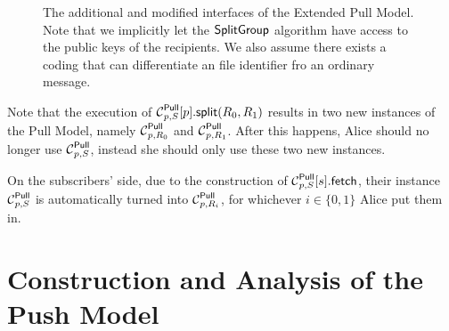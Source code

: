 \begin{figure}
  \caption{%
    The additional and modified interfaces of the Extended Pull Model.
    Note that we implicitly let the \(\SplitGroup\) algorithm have access to 
    the public keys of the recipients.
    We also assume there exists a coding that can differentiate an file 
    identifier fro an ordinary message.
  }\label{ExtPullFunctions}
\end{figure}

Note that the execution of \(\psplit[p, S]{p}[R_0, R_1]\) results in two new 
instances of the Pull Model, namely \(\Pull[p, R_0]\) and \(\Pull[p, R_1]\).
After this happens, Alice should no longer use \(\Pull[p, S]\), instead she 
should only use these two new instances.

On the subscribers' side, due to the construction of \(\pget[p, S]{s}\), their 
instance \(\Pull[p, S]\) is automatically turned into \(\Pull[p, R_i]\), for 
whichever \(i\in \{0, 1\}\) Alice put them in.


\section{Construction and Analysis of the Push Model}
\label{PushAnalysis}

